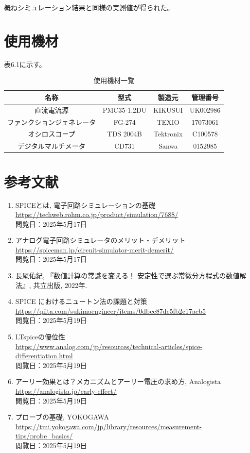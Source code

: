 \documentclass{jlreq}
\numberwithin{equation}{section}
\begin{document}
概ねシミュレーション結果と同様の実測値が得られた。

\section{使用機材}
表6.1に示す。
\begin{table}[H]
  \centering
  \caption{使用機材一覧}
  \begin{tabular}{|c|c|c|c|}
    \hline
    名称 & 型式 & 製造元 & 管理番号 \\ \hline
    直流電流源 & PMC35-1.2DU & KIKUSUI & UK002986 \\ \hline
    ファンクションジェネレータ & FG-274 & TEXIO & 17073061 \\ \hline
    オシロスコープ & TDS 2004B & Tektronix & C100578 \\ \hline
    デジタルマルチメータ & CD731 & Sanwa & 0152985 \\ \hline
  \end{tabular}
\end{table}

\section{参考文献}
\begin{enumerate}
  \item SPICEとは, 電子回路シミュレーションの基礎 \\
    \url{https://techweb.rohm.co.jp/product/simulation/7688/}\\
    閲覧日：2025年5月17日
  \item アナログ電子回路シミュレータのメリット・デメリット \\
    \url{https://spiceman.jp/circuit-simulator-merit-demerit/}\\
    閲覧日：2025年5月17日
  \item 長尾佑紀, 『数値計算の常識を変える！ 安定性で選ぶ常微分方程式の数値解法』, 共立出版, 2022年.
  \item SPICE におけるニュートン法の課題と対策\\
  \url{https://qiita.com/sukimaengineer/items/0dbce87dc5fb2c17aeb5} \\
  閲覧日：2025年5月19日
   \item LTspiceの優位性\\
  \url{https://www.analog.com/jp/resources/technical-articles/spice-differentiation.html} \\
  閲覧日：2025年5月19日
  \item アーリー効果とは？メカニズムとアーリー電圧の求め方, Analogista \\
  \url{https://analogista.jp/early-effect/} \\
  閲覧日：2025年5月19日
  \item プローブの基礎, YOKOGAWA \\
  \url{https://tmi.yokogawa.com/jp/library/resources/measurement-tips/probe_basics/} \\
  閲覧日：2025年5月19日
\end{enumerate}
\end{document}

